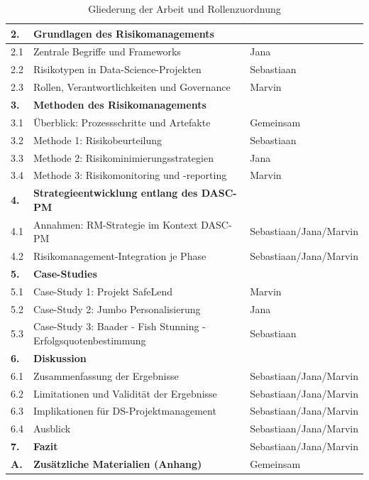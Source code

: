 \begin{table}[H]
\begin{tabular}{|p{1.5cm}|p{7.5cm}|p{5cm}|}
\textbf{2.} & \textbf{Grundlagen des Risikomanagements} & \\ \hline
2.1 & Zentrale Begriffe und Frameworks & Jana \\ \hline
2.2 & Risikotypen in Data-Science-Projekten & Sebastiaan \\ \hline
2.3 & Rollen, Verantwortlichkeiten und Governance & Marvin \\ \hline
\textbf{3.} & \textbf{Methoden des Risikomanagements} & \\ \hline
3.1 & Überblick: Prozessschritte und Artefakte & Gemeinsam \\ \hline
3.2 & Methode 1: Risikobeurteilung & Sebastiaan \\ \hline
3.3 & Methode 2: Risikominimierungsstrategien & Jana \\ \hline
3.4 & Methode 3: Risikomonitoring und -reporting & Marvin \\ \hline
\textbf{4.} & \textbf{Strategieentwicklung entlang des DASC-PM} & \\ \hline
4.1 & Annahmen: RM-Strategie im Kontext DASC-PM & Sebastiaan/Jana/Marvin \\ \hline
4.2 & Risikomanagement-Integration je Phase & Sebastiaan/Jana/Marvin \\ \hline
\textbf{5.} & \textbf{Case-Studies} & \\ \hline
5.1 & Case-Study 1: Projekt SafeLend & Marvin \\ \hline
5.2 & Case-Study 2: Jumbo Personalisierung & Jana \\ \hline
5.3 & Case-Study 3: Baader - Fish Stunning - Erfolgsquotenbestimmung & Sebastiaan \\ \hline
\textbf{6.} & \textbf{Diskussion} &  \\ \hline
6.1 & Zusammenfassung der Ergebnisse & Sebastiaan/Jana/Marvin \\ \hline
6.2 & Limitationen und Validität der Ergebnisse & Sebastiaan/Jana/Marvin \\ \hline
6.3 & Implikationen für DS-Projektmanagement & Sebastiaan/Jana/Marvin \\ \hline
6.4 & Ausblick & Sebastiaan/Jana/Marvin \\ \hline
        \textbf{7.} & \textbf{Fazit} & Sebastiaan/Jana/Marvin \\ \hline
\textbf{A.} & \textbf{Zusätzliche Materialien (Anhang)} & Gemeinsam \\ \hline
\end{tabular}
\caption{Gliederung der Arbeit und Rollenzuordnung}
    \label{tab:projektorganisation}
\end{table}

